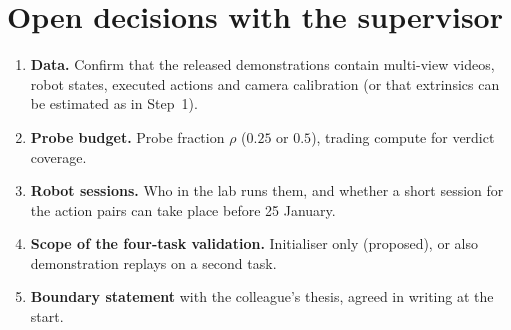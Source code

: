 \documentclass[11pt,a4paper]{article}
\theoremstyle{plain}
\theoremstyle{definition}
\theoremstyle{remark}
\begin{document}
\section{Open decisions with the supervisor}\label{sec:decisions}
\begin{enumerate}
\item \textbf{Data.} Confirm that the released demonstrations contain multi-view videos, robot states, executed actions and camera calibration (or that extrinsics can be estimated as in Step~1).
\item \textbf{Probe budget.} Probe fraction $\rho$ ($0.25$ or $0.5$), trading compute for verdict coverage.
\item \textbf{Robot sessions.} Who in the lab runs them, and whether a short session for the action pairs can take place before 25 January.
\item \textbf{Scope of the four-task validation.} Initialiser only (proposed), or also demonstration replays on a second task.
\item \textbf{Boundary statement} with the colleague's thesis, agreed in writing at the start.
\end{enumerate}

\appendix
\end{document}
